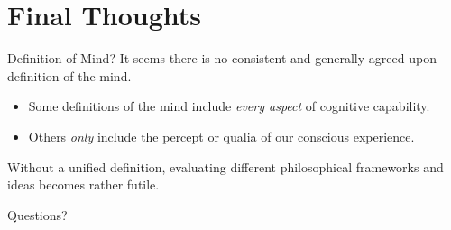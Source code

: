 \documentclass[aspectratio=1610]{beamer}
\begin{document}

\section{Final Thoughts}


\begin{frame}{Definition of Mind?}
	It seems there is no consistent and generally agreed upon definition of the \alert{mind}.

	\pause
	\vspace{2em}

	\begin{itemize}
		\item Some definitions of the mind include \textit{every aspect} of cognitive capability.
		\pause
		\item Others \textit{only} include the percept or \alert{qualia} of our conscious experience.
	\end{itemize}

	\pause
	\vspace{2em}

	Without a unified definition, evaluating different philosophical frameworks and ideas becomes rather futile.
\end{frame}


\begin{frame}[standout]
	Questions?
\end{frame}
\end{document}
